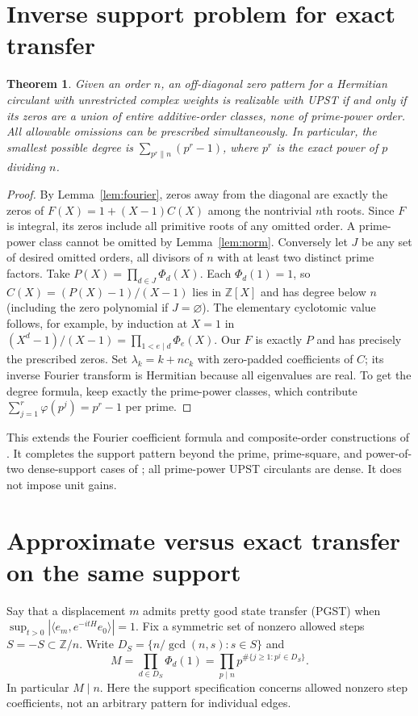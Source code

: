 \documentclass[10pt]{article}
\newtheorem{theorem}{Theorem}
\newcommand{\ZZ}{\mathbb Z}\newcommand{\QQ}{\mathbb Q}
\begin{document}
\section{Inverse support problem for exact transfer}
\begin{theorem}\label{th:support}
Given an order $n$, an off-diagonal zero pattern for a Hermitian circulant
with unrestricted complex weights is realizable with UPST if and only if
its zeros are a union of entire additive-order classes, none of prime-power order.
All allowable omissions can be prescribed simultaneously. In particular,
the smallest possible degree is $\sum_{p^r\parallel n}(p^r-1)$, where $p^r$ is the exact power of $p$ dividing $n$.
\end{theorem}
\begin{proof}
By Lemma~\ref{lem:fourier}, zeros away from the diagonal are exactly the
zeros of $F(X)=1+(X-1)C(X)$ among the nontrivial $n$th roots. Since $F$ is integral,
its zeros include all primitive roots of any omitted order.
A prime-power class cannot be omitted by Lemma~\ref{lem:norm}.
Conversely let $J$ be any set of desired omitted orders, all divisors of
$n$ with at least two distinct prime factors. Take
$P(X)=\prod_{d\in J}\Phi_d(X)$. Each $\Phi_d(1)=1$, so $C(X)=(P(X)-1)/(X-1)$ lies in $\ZZ[X]$ and has degree below $n$ (including the zero polynomial if $J=\varnothing$).
The elementary cyclotomic value follows, for example, by induction at $X=1$ in $(X^d-1)/(X-1)=\prod_{1<e\mid d}\Phi_e(X)$.
Our $F$ is exactly $P$ and has precisely the prescribed zeros. Set $\lambda_k=k+n c_k$ with zero-padded coefficients of $C$; its inverse Fourier transform is Hermitian because all eigenvalues are real. To get the degree formula, keep exactly the prime-power classes, which contribute $\sum_{j=1}^r\varphi(p^j)=p^r-1$ per prime.
\end{proof}
This extends the Fourier coefficient formula and composite-order constructions of \cite[Secs.~6--7]{connelly}. It completes the support pattern beyond the prime, prime-square, and power-of-two dense-support cases of \cite{connelly}; all prime-power UPST circulants are dense. It does not impose unit gains.

\section{Approximate versus exact transfer on the same support}
Say that a displacement $m$ admits pretty good state transfer (PGST) when
$\sup_{t>0}|\langle e_m,e^{-itH}e_0\rangle|=1$.
Fix a symmetric set of nonzero allowed steps $S=-S\subset\ZZ/n$.
Write $D_S=\{n/\gcd(n,s):s\in S\}$ and
\[
 M=\prod_{d\in D_S}\Phi_d(1)
   =\prod_{p\mid n}p^{\#\{j\ge1:p^j\in D_S\}} .
\]
In particular $M\mid n$. Here the support specification concerns allowed nonzero step coefficients, not an arbitrary pattern for individual edges.
\end{document}
